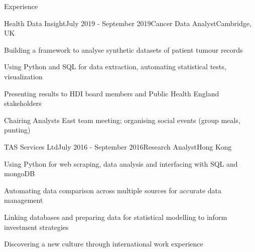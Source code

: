 \documentclass{resume} %
\begin{document}
\begin{rSection}{Experience}

\begin{rSubsection}{Health Data Insight}{July 2019 - September 2019}{Cancer Data Analyst}{Cambridge, UK}
\item Building a framework to analyse synthetic datasets of patient tumour records
\item Using Python and SQL for data extraction, automating statistical tests, visualization
\item Presenting results to HDI board members and Public Health England stakeholders
\item Chairing Analysts East team meeting; organising social events (group meals, punting)
\end{rSubsection}




\begin{rSubsection}{TAS Services Ltd}{July 2016 - September 2016}{Research Analyst}{Hong Kong}
\item Using Python for web scraping, data analysis and interfacing with SQL and mongoDB
\item Automating data comparison across multiple sources for accurate data management
\item Linking databases and preparing data for statistical modelling to inform investment strategies
\item Discovering a new culture through international work experience
\end{rSubsection}



\end{rSection}
\end{document}

